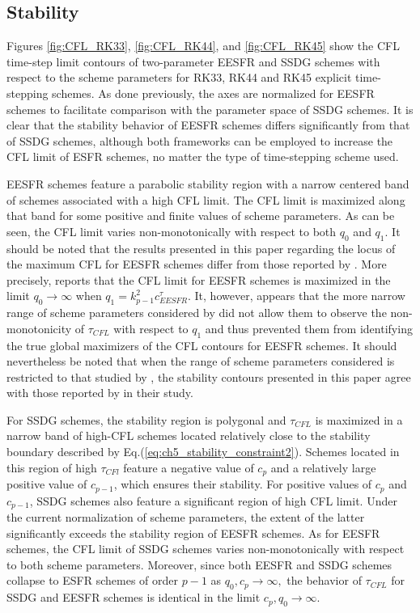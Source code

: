 \documentclass[preprint,12pt]{elsarticle}
\begin{document}
\subsection{Stability}
Figures \ref{fig:CFL_RK33}, \ref{fig:CFL_RK44}, and \ref{fig:CFL_RK45} show the CFL time-step limit contours of two-parameter EESFR and SSDG schemes with respect to the scheme parameters for RK33, RK44 and RK45 explicit time-stepping schemes. As done previously, the axes are normalized for EESFR schemes to facilitate comparison with the parameter space of SSDG schemes. It is clear that the stability behavior of EESFR schemes differs significantly from that of SSDG schemes, although both frameworks can be employed to increase the CFL limit of ESFR schemes, no matter the type of time-stepping scheme used.

EESFR schemes feature a parabolic stability region with a narrow centered band of schemes associated with a high CFL limit. The CFL limit is maximized along that band for some positive and finite values of scheme parameters. As can be seen, the CFL limit varies non-monotonically with respect to both $q_0$ and $q_1$. It should be noted that the results presented in this paper regarding the locus of the maximum CFL for EESFR schemes differ from those reported by \cite{vermeire2016properties}. More precisely, \cite{vermeire2016properties} reports that the CFL limit for EESFR schemes is maximized in the limit $q_0 \to \infty$ when $q_1 = k_{p-1}^2c_{EESFR}^\tau$. It, however, appears that the more narrow range of scheme parameters considered by \cite{vermeire2016properties} did not allow them to observe the non-monotonicity of $\tau_{CFL}$ with respect to $q_1$ and thus prevented them from identifying the true global maximizers of the CFL contours for EESFR schemes. It should nevertheless be noted that when the range of scheme parameters considered is restricted to that studied by \cite{vermeire2016properties}, the stability contours presented in this paper agree with those reported by in their study.

For SSDG schemes, the stability region is polygonal and $\tau_{CFL}$ is maximized in a narrow band of high-CFL schemes located relatively close to the stability boundary described by Eq.(\ref{eq:ch5_stability_constraint2}). Schemes located in this region of high $\tau_{CFl}$ feature a negative value of $c_p$ and a relatively large positive value of $c_{p-1}$, which ensures their stability. For positive values of $c_p$ and $c_{p-1}$, SSDG schemes also feature a significant region of high CFL limit. Under the current normalization of scheme parameters, the extent of the latter significantly exceeds the stability region of EESFR schemes. As for EESFR schemes, the CFL limit of SSDG schemes varies non-monotonically with respect to both scheme parameters. Moreover, since both EESFR and SSDG schemes collapse to ESFR schemes of order $p-1$ as $q_0, c_p \to \infty,$ the behavior of $\tau_{CFL}$ for SSDG and EESFR schemes is identical in the limit $c_p, q_0 \to \infty$.
\end{document}
